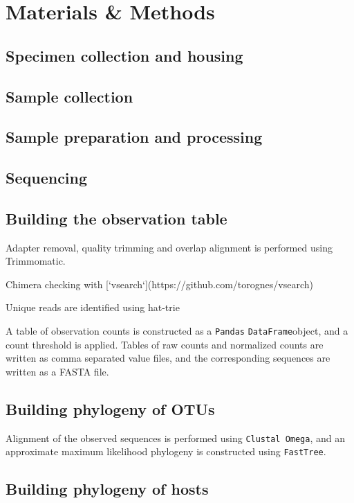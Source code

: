 \section{Materials \& Methods}

\subsection{Specimen collection and housing}

\subsection{Sample collection}

\subsection{Sample preparation and processing}

\subsection{Sequencing}

\subsection{Building the observation table}

Adapter removal, quality trimming and overlap alignment is performed using Trimmomatic.

Chimera checking with [`vsearch`](https://github.com/torognes/vsearch)

Unique reads are identified using hat-trie

A table of observation counts is constructed as a {\tt Pandas} {\tt DataFrame}object, and a count threshold is applied. Tables of raw counts and normalized counts are written as comma separated value files, and the corresponding sequences are written as a FASTA file.

\subsection{Building phylogeny of OTUs}

Alignment of the observed sequences is performed using {\tt Clustal Omega}, and an approximate maximum likelihood phylogeny is constructed using {\tt FastTree}.

\subsection{Building phylogeny of hosts}

